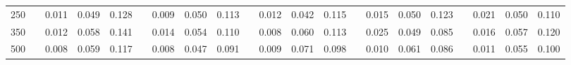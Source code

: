 % 
\begin{tabular}{ccccccccccccccccccccc}
  \hline
  \hline
250 &  & 0.011 & 0.049 & 0.128 &  & 0.009 & 0.050 & 0.113 &  & 0.012 & 0.042 & 0.115 &  & 0.015 & 0.050 & 0.123 &  & 0.021 & 0.050 & 0.110 \\ 
  350 &  & 0.012 & 0.058 & 0.141 &  & 0.014 & 0.054 & 0.110 &  & 0.008 & 0.060 & 0.113 &  & 0.025 & 0.049 & 0.085 &  & 0.016 & 0.057 & 0.120 \\ 
  500 &  & 0.008 & 0.059 & 0.117 &  & 0.008 & 0.047 & 0.091 &  & 0.009 & 0.071 & 0.098 &  & 0.010 & 0.061 & 0.086 &  & 0.011 & 0.055 & 0.100 \\ 
   \hline
\end{tabular}
